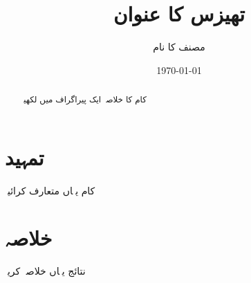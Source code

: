 \documentclass[12pt]{report}
\title{تھیزس کا عنوان}
\author{مصنف کا نام}
\date{\today}
\begin{document}
\maketitle

\begin{abstract}
کام کا خلاصہ ایک پیراگراف میں لکھیںؔ
\end{abstract}

\tableofcontents

\chapter{تمہید}
کام یہاں متعارف کرائیںؔ

\chapter{خلاصہ}
نتائج یہاں خلاصہ کریںؔ
\end{document}
